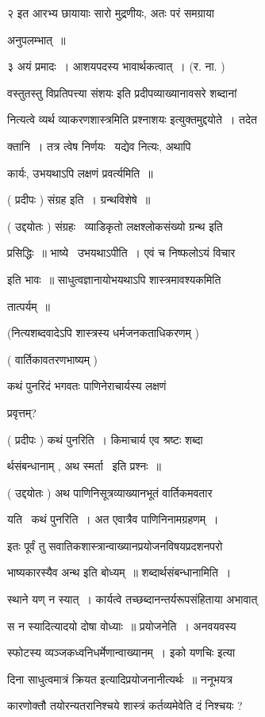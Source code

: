 \documentclass[11pt, openany]{book}
\begin{document}
२ इत आरभ्य छायायाः सारो मुद्रणीयः, अतः परं समग्राया 

अनुपलम्भात्~॥ 

३ अयं प्रमादः~। आशयपदस्य भावार्थकत्वात्~। (र. ना. ) 

वस्तुतस्तु {\qt विप्रतिपत्त्या संशयः} इति प्रदीपव्याख्यानावसरे शब्दानां 

नित्यत्वे व्यर्थ व्याकरणशास्त्रमिति प्रश्नाशयः इत्युक्तमुद्दयोते~। 
तदेत \textendash\ 





क्तानि~। तत्र त्वेष निर्णयः \textendash\ यद्येव नित्यः, अथापि 

कार्यः, उभयथाऽपि लक्षणं प्रवर्त्यमिति~॥ 

( प्रदीपः ) संग्रह इति~। ग्रन्थविशेषे~॥ 

( उद्दयोतः ) संग्रहः \textendash\ व्याडिकृतो लक्षश्लोकसंख्यो ग्रन्थ इति 

प्रसिद्धिः~॥ भाष्ये \textendash\ उभयथाऽपीति~। एवं च निष्फलोऽयं विचार 

इति भावः~॥ साधुत्वज्ञानायोभयथाऽपि शास्त्रमावश्यकमिति 

तात्पर्यम्~॥ 

(नित्यशब्दवादेऽपि शास्त्रस्य धर्मजनकताधिकरणम् ) 

( वार्तिकावतरणभाष्यम् ) 

कथं पुनरिदं भगवतः पाणिनेराचार्यस्य लक्षणं 

प्रवृत्तम्? 

( प्रदीपः ) कथं पुनरिति~। किमाचार्य एव श्रष्टः शब्दा \textendash\ 

र्थसंबन्धानाम् , अथ स्मर्ता \textendash\ इति प्रश्नः~॥ 

( उद्दयोतः ) अथ पाणिनिसूत्रव्याख्यानभूतं वार्तिकमवतार \textendash\ 

यति \textendash\ कथं पुनरिति~। अत एवात्रैव पाणिनिनामग्रहणम्~। 

इतः पूर्वं तु सवातिकशास्त्रान्वाख्यानप्रयोजनविषयप्रदशनपरो 

भाष्यकारस्यैव अन्थ इति बोध्यम्~॥ शब्दार्थसंबन्धानामिति~। 



स्थाने यण् न स्यात्~। कार्यत्वे तच्छब्दानन्तर्यरूपसंहिताया अभावात् 

स न स्यादित्यादयो दोषा वोध्याः~॥ प्रयोजनेति~। अनवयवस्य 

स्फोटस्य व्यञ्जकध्वनिधर्मेणान्वाख्यानम्~। {\qt इको यणचिः} इत्या \textendash\ 

दिना साधुत्वमात्रं क्रियत इत्यादिप्रयोजनानीत्यर्थः~॥ ननूभयत्र 

कारणोक्तौ तयोरन्यतरानिश्चये शास्त्रं कर्तव्यमेवेति दं निश्चयः ? 
\end{document}
